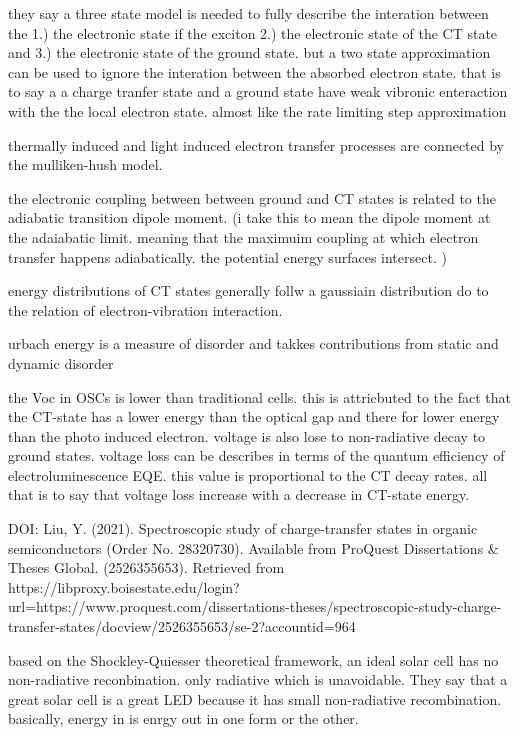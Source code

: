     they say a three state model is needed to fully describe the interation between the 1.) the electronic state if the exciton 
    2.) the electronic state of the CT state and 3.) the electronic state of the ground state. but a two state approximation can
    be used to ignore the interation between the absorbed electron state. that is to say a a charge tranfer state and a ground state 
    have weak vibronic enteraction with the the local electron state. almost like the rate limiting step approximation

    thermally induced and light induced electron transfer processes are connected by the mulliken-hush model.
    
    the electronic coupling between between ground and CT states is related to the adiabatic transition dipole moment. (i
    take this to mean the dipole moment at the adaiabatic limit. meaning that the maximuim coupling at which electron transfer 
    happens adiabatically. the potential energy surfaces intersect. )

    energy distributions of CT states generally follw a gaussiain distribution do to the relation of electron-vibration interaction. 

    urbach energy is a measure of disorder and takkes contributions from static and dynamic disorder
    
    the Voc in OSCs is lower than traditional cells. this is attricbuted to the fact that the CT-state has a lower energy
    than the optical gap and there for lower energy than the photo induced electron. voltage is also lose to non-radiative
    decay to ground states. voltage loss can be describes in terms of the quantum efficiency of electroluminescence EQE.  this
    value is proportional to the CT decay rates. all that is to say that voltage loss increase with a decrease in CT-state energy.



DOI: Liu, Y. (2021). Spectroscopic study of charge-transfer states in organic semiconductors (Order No. 28320730). Available from ProQuest Dissertations & Theses Global. (2526355653). Retrieved from https://libproxy.boisestate.edu/login?url=https://www.proquest.com/dissertations-theses/spectroscopic-study-charge-transfer-states/docview/2526355653/se-2?accountid=964

    based on the Shockley-Quiesser theoretical framework, an ideal solar cell has no non-radiative reconbination. only radiative which is
    unavoidable. They say that a great solar cell is a great LED because it has small non-radiative recombination. 
    basically, energy in is enrgy out in one form or the other.

